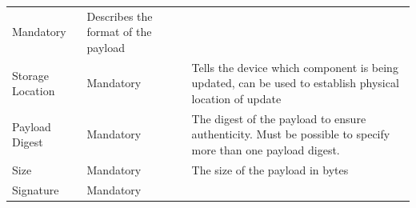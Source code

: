 \documentclass[0-thesis.tex]{subfiles}
\begin{document}
\begin{longtable}[]{@{}lll@{}}
\begin{minipage}[t]{0.26\columnwidth}
    Mandatory\strut
    \end{minipage} & \begin{minipage}[t]{0.42\columnwidth}\raggedright\strut
    Describes the format of the payload\strut
    \end{minipage}\tabularnewline
    \begin{minipage}[t]{0.23\columnwidth}\raggedright\strut
    Storage Location\strut
    \end{minipage} & \begin{minipage}[t]{0.26\columnwidth}\raggedright\strut
    Mandatory\strut
    \end{minipage} & \begin{minipage}[t]{0.42\columnwidth}\raggedright\strut
    Tells the device which component is being updated, can be used to
    establish physical location of update\strut
    \end{minipage}\tabularnewline
    \begin{minipage}[t]{0.23\columnwidth}\raggedright\strut
    Payload Digest\strut
    \end{minipage} & \begin{minipage}[t]{0.26\columnwidth}\raggedright\strut
    Mandatory\strut
    \end{minipage} & \begin{minipage}[t]{0.42\columnwidth}\raggedright\strut
    The digest of the payload to ensure authenticity. Must be possible to
    specify more than one payload digest.\strut
    \end{minipage}\tabularnewline
    \begin{minipage}[t]{0.23\columnwidth}\raggedright\strut
    Size\strut
    \end{minipage} & \begin{minipage}[t]{0.26\columnwidth}\raggedright\strut
    Mandatory\strut
    \end{minipage} & \begin{minipage}[t]{0.42\columnwidth}\raggedright\strut
    The size of the payload in bytes\strut
    \end{minipage}\tabularnewline
    \begin{minipage}[t]{0.23\columnwidth}\raggedright\strut
    Signature\strut
    \end{minipage} & \begin{minipage}[t]{0.26\columnwidth}\raggedright\strut
    Mandatory\strut
    \end{minipage} & \begin{minipage}[t]{0.42\columnwidth}\raggedright\strut

\end{minipage}
\end{longtable}
\end{document}
